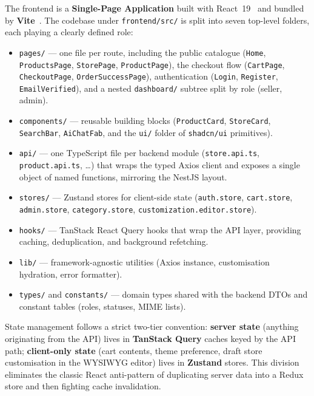 \documentclass[12pt, a4paper, oneside]{report}
\begin{document}
The frontend is a \textbf{Single-Page Application} built with
React~19~\cite{react}
and bundled by \textbf{Vite}~\cite{vite}. The codebase under
\texttt{frontend/src/} is split into seven top-level folders, each
playing a clearly defined role:

\begin{itemize}[leftmargin=*,itemsep=2pt]
  \item \texttt{pages/} --- one file per route, including the public
        catalogue (\texttt{Home}, \texttt{ProductsPage},
        \texttt{StorePage}, \texttt{ProductPage}), the checkout flow
        (\texttt{CartPage}, \texttt{CheckoutPage},
        \texttt{OrderSuccessPage}), authentication
        (\texttt{Login}, \texttt{Register},
        \texttt{EmailVerified}), and a nested
        \texttt{dashboard/} subtree split by role (seller, admin).
  \item \texttt{components/} --- reusable building blocks
        (\texttt{ProductCard}, \texttt{StoreCard},
        \texttt{SearchBar}, \texttt{AiChatFab}, and the
        \texttt{ui/} folder of \texttt{shadcn/ui} primitives).
  \item \texttt{api/} --- one TypeScript file per backend module
        (\texttt{store.api.ts}, \texttt{product.api.ts}, \ldots)
        that wraps the typed Axios client and exposes a single
        object of named functions, mirroring the NestJS layout.
  \item \texttt{stores/} --- Zustand stores for client-side state
        (\texttt{auth.store}, \texttt{cart.store},
        \texttt{admin.store}, \texttt{category.store},
        \texttt{customization.editor.store}).
  \item \texttt{hooks/} --- TanStack React Query hooks that wrap
        the API layer, providing caching, deduplication, and
        background refetching.
  \item \texttt{lib/} --- framework-agnostic utilities (Axios
        instance, customisation hydration, error formatter).
  \item \texttt{types/} and \texttt{constants/} --- domain types
        shared with the backend DTOs and constant tables (roles,
        statuses, MIME lists).
\end{itemize}

State management follows a strict two-tier convention: \textbf{server
state} (anything originating from the API) lives in \textbf{TanStack
Query} caches keyed by the API path; \textbf{client-only state} (cart
contents, theme preference, draft store customisation in the WYSIWYG
editor) lives in \textbf{Zustand} stores. This division eliminates the
classic React anti-pattern of duplicating server data into a Redux
store and then fighting cache invalidation.
\end{document}
